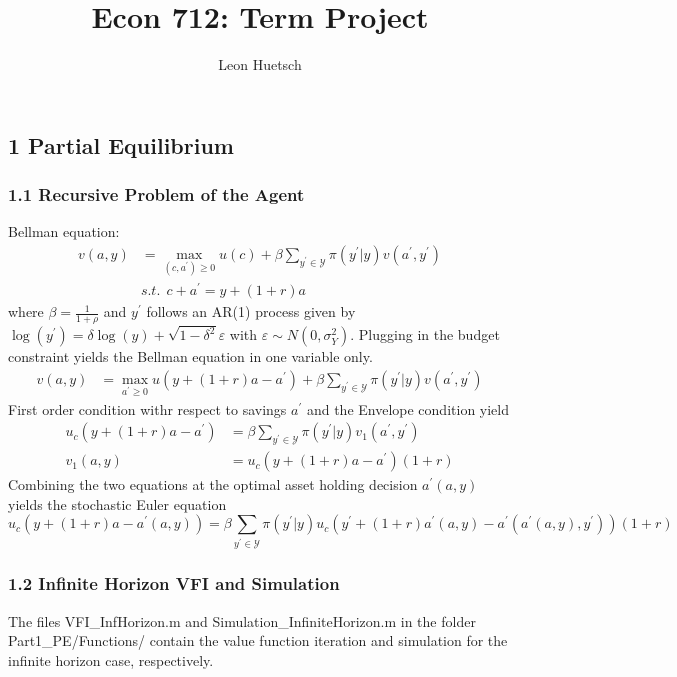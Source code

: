 \documentclass[letterpaper,12pt]{article}
\title{\fontsize{16pt}{1em}\bfseries Econ 712: Term Project}
\author{Leon Huetsch}
\begin{document}
\maketitle

\subsection*{1 Partial Equilibrium}
\subsubsection*{1.1 Recursive Problem of the Agent}
Bellman equation:
\begin{align*}
v(a,y) &= \max_{(c,a^{\prime})\ge 0} u(c) + \beta \sum_{y^{\prime} \in \mathcal{Y}} \pi \left(y^{\prime} | y \right) v(a^{\prime},y^{\prime}) \\
&\textit{s.t.} \ \ c + a^{\prime} = y + (1+r)a 
\end{align*}
where $\beta = \frac{1}{1+\rho}$ and $y^{\prime}$ follows an AR(1) process given by $\log(y^{\prime}) = \delta \log(y) + \sqrt{1-\delta^2} \varepsilon$ with $\varepsilon \sim N(0,\sigma_Y^2)$. \newline \newline
Plugging in the budget constraint yields the Bellman equation in one variable only.
\begin{align}
v(a,y) &= \max_{a^{\prime}\ge 0} u(y + (1+r)a - a^{\prime}) + \beta \sum_{y^{\prime} \in \mathcal{Y}} \pi \left(y^{\prime} | y \right) v(a^{\prime},y^{\prime})
\end{align}
First order condition withr respect to savings $a^{\prime}$ and the Envelope condition yield
\begin{align*}
u_c (y + (1+r)a - a^{\prime}) &= \beta \sum_{y^{\prime} \in \mathcal{Y}} \pi \left(y^{\prime} | y \right) v_1 (a^{\prime},y^{\prime}) \\
v_1 (a,y) &= u_c (y + (1+r)a - a^{\prime}) (1+r)
\end{align*}
Combining the two equations at the optimal asset holding decision $a^{\prime} (a,y)$ yields the stochastic Euler equation
\begin{equation}
u_c (y + (1+r)a - a^{\prime} (a,y)) = \beta \sum_{y^{\prime} \in \mathcal{Y}} \pi \left(y^{\prime} | y \right) u_c \left( y^{\prime} + (1+r) a^{\prime} (a,y) - a^{\prime} (a^{\prime} (a,y),y^{\prime}) \right) (1+r)
\end{equation}




\subsubsection*{1.2 Infinite Horizon VFI and Simulation}
The files VFI\_InfHorizon.m and Simulation\_InfiniteHorizon.m in the folder Part1\_PE/Functions/ contain the value function iteration and simulation for the infinite horizon case, respectively.
\end{document}
